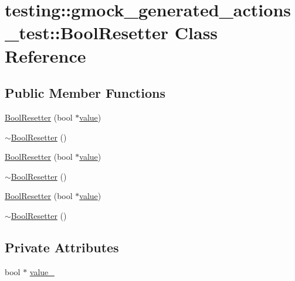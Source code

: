 \hypertarget{classtesting_1_1gmock__generated__actions__test_1_1_bool_resetter}{}\section{testing\+::gmock\+\_\+generated\+\_\+actions\+\_\+test\+::Bool\+Resetter Class Reference}
\label{classtesting_1_1gmock__generated__actions__test_1_1_bool_resetter}
\subsection*{Public Member Functions}
\begin{DoxyCompactItemize}
\item 
\mbox{\hyperlink{classtesting_1_1gmock__generated__actions__test_1_1_bool_resetter_a55776cb9ef3b358e48898bb0257646ea}{Bool\+Resetter}} (bool $\ast$\mbox{\hyperlink{_obj__test_2lib_2googletest-master_2googlemock_2test_2gmock-matchers__test_8cc_a337b8a670efc0b086ad3af163f3121b6}{value}})
\item 
\mbox{\hyperlink{classtesting_1_1gmock__generated__actions__test_1_1_bool_resetter_a814afb883394b0fe7d7c8c1aa22d9cb6}{$\sim$\+Bool\+Resetter}} ()
\item 
\mbox{\hyperlink{classtesting_1_1gmock__generated__actions__test_1_1_bool_resetter_a55776cb9ef3b358e48898bb0257646ea}{Bool\+Resetter}} (bool $\ast$\mbox{\hyperlink{_obj__test_2lib_2googletest-master_2googlemock_2test_2gmock-matchers__test_8cc_a337b8a670efc0b086ad3af163f3121b6}{value}})
\item 
\mbox{\hyperlink{classtesting_1_1gmock__generated__actions__test_1_1_bool_resetter_a814afb883394b0fe7d7c8c1aa22d9cb6}{$\sim$\+Bool\+Resetter}} ()
\item 
\mbox{\hyperlink{classtesting_1_1gmock__generated__actions__test_1_1_bool_resetter_a55776cb9ef3b358e48898bb0257646ea}{Bool\+Resetter}} (bool $\ast$\mbox{\hyperlink{_obj__test_2lib_2googletest-master_2googlemock_2test_2gmock-matchers__test_8cc_a337b8a670efc0b086ad3af163f3121b6}{value}})
\item 
\mbox{\hyperlink{classtesting_1_1gmock__generated__actions__test_1_1_bool_resetter_a814afb883394b0fe7d7c8c1aa22d9cb6}{$\sim$\+Bool\+Resetter}} ()
\end{DoxyCompactItemize}
\subsection*{Private Attributes}
\begin{DoxyCompactItemize}
\item 
bool $\ast$ \mbox{\hyperlink{classtesting_1_1gmock__generated__actions__test_1_1_bool_resetter_a47d78c6dcda2174101233746d05a4e6b}{value\+\_\+}}
\end{DoxyCompactItemize}


